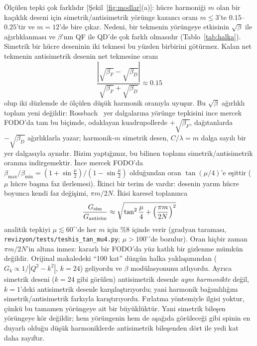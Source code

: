 \documentclass[11pt,a4paper]{article}
\begin{document}
Ölçülen tepki çok farklıdır [Şekil~\ref{fig:modlar}(a)]: hücre harmoniği $m$ olan bir kaçıklık deseni için
simetrik/antisimetrik yörünge kazancı oranı $m\le3$'te $0.15$--$0.25$'tir ve $m=12$'de bire çıkar. Nedeni, bir
tekmenin yörüngeye etkisinin $\sqrt{\beta}$ ile ağırlıklanması ve $\beta$'nın QF ile QD'de çok farklı olmasıdır
(Tablo~\ref{tab:halka}). Simetrik bir hücre deseninin iki tekmesi bu yüzden birbirini götürmez. Kalan net
tekmenin antisimetrik desenin net tekmesine oranı
\begin{equation}
\frac{|\sqrt{\beta_F}-\sqrt{\beta_D}|}{\sqrt{\beta_F}+\sqrt{\beta_D}}\approx0.15
\end{equation}
olup iki düzlemde de ölçülen düşük harmonik oranıyla uyuşur. Bu $\sqrt{\beta}$ ağırlıklı toplam yeni değildir:
Rossbach~\cite{rossbach} yer dalgalarına yörünge tepkisini ince mercek FODO'da tam bu biçimde, odaklayan
kuadrupollerde $+\sqrt{\beta_F}$, dağıtanlarda $-\sqrt{\beta_D}$ ağırlıklarla yazar; harmonik-$m$ simetrik
desen, $C/\lambda=m$ dalga sayılı bir yer dalgasıyla aynıdır. Bizim yaptığımız, bu bilinen toplamı
simetrik/antisimetrik oranına indirgemektir. İnce mercek FODO'da $\beta_\text{max}/\beta_\text{min}=
(1+\sin\frac{\mu}{2})/(1-\sin\frac{\mu}{2})$ olduğundan oran $\tan(\mu/4)$'e eşittir ($\mu$ hücre başına faz
ilerlemesi). İkinci bir terim de vardır: desenin yarım hücre boyunca kendi faz değişimi, $\pi m/2N$. İkisi
karesel toplanınca
\begin{equation}
\frac{G_\text{sim}}{G_\text{antisim}}\approx\sqrt{\tan^2\frac{\mu}{4}+\Bigl(\frac{\pi m}{2N}\Bigr)^2}
\end{equation}
analitik tepkiyi $\mu\lesssim60^\circ$'de her $m$ için \%8 içinde verir (gradyan taraması,
\texttt{revizyon/tests/teshis\_tan\_mu4.py}; $\mu>100^\circ$'de bozulur). Oran hiçbir zaman $\pi m/2N$'in altına
inmez: kararlı bir FODO'da yüz katlık bir gizlenme mümkün değildir. Orijinal makaledeki ``100 kat'' düzgün halka
yaklaşımından ($G_k\propto1/|Q^2-k^2|$, $k=24$) geliyordu ve $\beta$ modülasyonunu atlıyordu. Ayrıca simetrik
deseni ($k=24$ gibi görülen) antisimetrik desenle \emph{aynı harmonikte} değil, $k=1$'deki antisimetrik desenle
karşılaştırıyordu; yani harmonik bağımlılığını simetrik/antisimetrik farkıyla karıştırıyordu. Fırlatma
yöntemiyle ilgisi yoktur, çünkü bu tamamen yörüngeye ait bir büyüklüktür. Yani simetrik bileşen yörüngeye kör değildir;
hem yörüngenin hem de aşağıda görüleceği gibi spinin en duyarlı olduğu düşük harmoniklerde antisimetrik
bileşenden dört ile yedi kat daha zayıftır.
\end{document}
